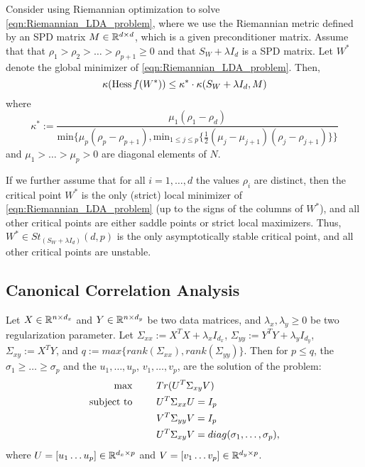 \documentclass[11pt,a4paper]{article}
\begin{document}
\begin{proposition}
Consider using Riemannian optimization to solve \eqref{eqn:Riemannian_LDA_problem}, where we use the Riemannian metric defined by an SPD matrix $M\in\mathbb{R}^{d\times d}$, which is a given preconditioner matrix. Assume that that $\rho_1>\rho_2>\ldots>\rho_{p+1}\ge 0$ and that $S_W+\lambda I_d$ is a SPD matrix. Let $W^*$ denote the global minimizer of \eqref{eqn:Riemannian_LDA_problem}. Then,
\begin{equation*}
\kappa(\text{Hess}\, f(W^*)) \le \kappa^*\cdot \kappa(S_W+\lambda I_d, M)
\end{equation*}
where 
\begin{equation*}
\kappa^* := \dfrac{\mu_1(\rho_1-\rho_d)}{\text{min}\{\mu_p(\rho_p-\rho_{p+1}),{\text{min}}_{1\le j\le p}\{\frac{1}{2}(\mu_j-\mu_{j+1})(\rho_j-\rho_{j+1})\}\}}
\end{equation*}
and $\mu_1>\ldots>\mu_p>0$ are diagonal elements of $N$.

If we further assume that for all $i = 1,\ldots, d$ the values $\rho_i$ are distinct, then the critical point $W^*$ is the only (strict) local minimizer of \eqref{eqn:Riemannian_LDA_problem} (up to the signs of the columns of $W^*$), and all other critical points are either saddle points or strict local maximizers. Thus, $W^*\in St_{(S_W+\lambda I_d)}(d,p)$ is the only asymptotically stable critical point, and all other critical points are unstable.
\end{proposition}

\subsection{Canonical Correlation Analysis}

Let $X\in \mathbb{R}^{n\times d_x}$ and $Y\in \mathbb{R}^{n\times d_y}$ be two data matrices, and $\lambda_x,\lambda_y\ge 0$ be two regularization parameter. Let $\Sigma_{xx}:=X^TX+\lambda_x I_{d_x}$, $\Sigma_{yy}:=Y^TY+\lambda_y I_{d_y}$, $\Sigma_{xy}:= X^TY$, and $q := max\{rank(\Sigma_{xx}),rank(\Sigma_{yy})\}$. Then for $p\le q$, the  $\sigma_1\ge \ldots\ge \sigma_p$ and the  $u_1,\ldots,u_p$,  $v_1,\ldots,v_p$, are the solution of the problem:
\begin{alignat*}{3}
{\text{max}}& &&Tr(U^T\Sigma_{xy}V) \\
\text{subject to}&\hspace{0.5cm} &&U^T\Sigma_{xx}U = I_p \\
& &&V^T\Sigma_{yy}V = I_p\\
& &&U^T\Sigma_{xy}V = diag(\sigma_1,\ldots,\sigma_p),
\end{alignat*}
where $U = [u_1 \ldots u_p]\in\mathbb{R}^{d_x\times p}$ and $V = [v_1 \ldots v_p]\in\mathbb{R}^{d_y\times p}$.
\end{document}
